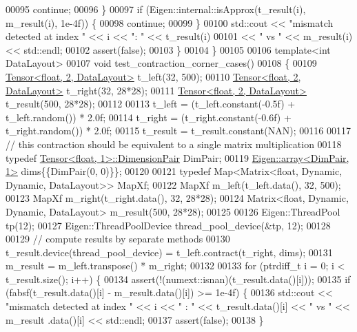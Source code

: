 \begin{DoxyCode}
00095       \textcolor{keywordflow}{continue};
00096     \}
00097     \textcolor{keywordflow}{if} (Eigen::internal::isApprox(t\_result(i), m\_result(i), 1e-4f)) \{
00098       \textcolor{keywordflow}{continue};
00099     \}
00100     std::cout << \textcolor{stringliteral}{"mismatch detected at index "} << i << \textcolor{stringliteral}{": "} << t\_result(i)
00101               << \textcolor{stringliteral}{" vs "} <<  m\_result(i) << std::endl;
00102     assert(\textcolor{keyword}{false});
00103   \}
00104 \}
00105 
00106 \textcolor{keyword}{template}<\textcolor{keywordtype}{int} DataLayout>
00107 \textcolor{keywordtype}{void} test\_contraction\_corner\_cases()
00108 \{
00109   \hyperlink{class_eigen_1_1_tensor}{Tensor<float, 2, DataLayout>} t\_left(32, 500);
00110   \hyperlink{class_eigen_1_1_tensor}{Tensor<float, 2, DataLayout>} t\_right(32, 28*28);
00111   \hyperlink{class_eigen_1_1_tensor}{Tensor<float, 2, DataLayout>} t\_result(500, 28*28);
00112 
00113   t\_left = (t\_left.constant(-0.5f) + t\_left.random()) * 2.0f;
00114   t\_right = (t\_right.constant(-0.6f) + t\_right.random()) * 2.0f;
00115   t\_result = t\_result.constant(NAN);
00116 
00117   \textcolor{comment}{// this contraction should be equivalent to a single matrix multiplication}
00118   \textcolor{keyword}{typedef} \hyperlink{class_eigen_1_1_tensor}{Tensor<float, 1>::DimensionPair} DimPair;
00119   \hyperlink{class_eigen_1_1array}{Eigen::array<DimPair, 1>} dims\{\{DimPair(0, 0)\}\};
00120 
00121   \textcolor{keyword}{typedef} Map<Matrix<float, Dynamic, Dynamic, DataLayout>> MapXf;
00122   MapXf m\_left(t\_left.data(), 32, 500);
00123   MapXf m\_right(t\_right.data(), 32, 28*28);
00124   Matrix<float, Dynamic, Dynamic, DataLayout> m\_result(500, 28*28);
00125 
00126   Eigen::ThreadPool tp(12);
00127   Eigen::ThreadPoolDevice thread\_pool\_device(&tp, 12);
00128 
00129   \textcolor{comment}{// compute results by separate methods}
00130   t\_result.device(thread\_pool\_device) = t\_left.contract(t\_right, dims);
00131   m\_result = m\_left.transpose() * m\_right;
00132 
00133   \textcolor{keywordflow}{for} (ptrdiff\_t i = 0; i < t\_result.size(); i++) \{
00134     assert(!(numext::isnan)(t\_result.data()[i]));
00135     \textcolor{keywordflow}{if} (fabsf(t\_result.data()[i] - m\_result.data()[i]) >= 1e-4f) \{
00136       std::cout << \textcolor{stringliteral}{"mismatch detected at index "} << i << \textcolor{stringliteral}{" : "} << t\_result.data()[i] << \textcolor{stringliteral}{" vs "} <<  m\_result
      .data()[i] << std::endl;
00137       assert(\textcolor{keyword}{false});
00138     \}

\end{DoxyCode}
